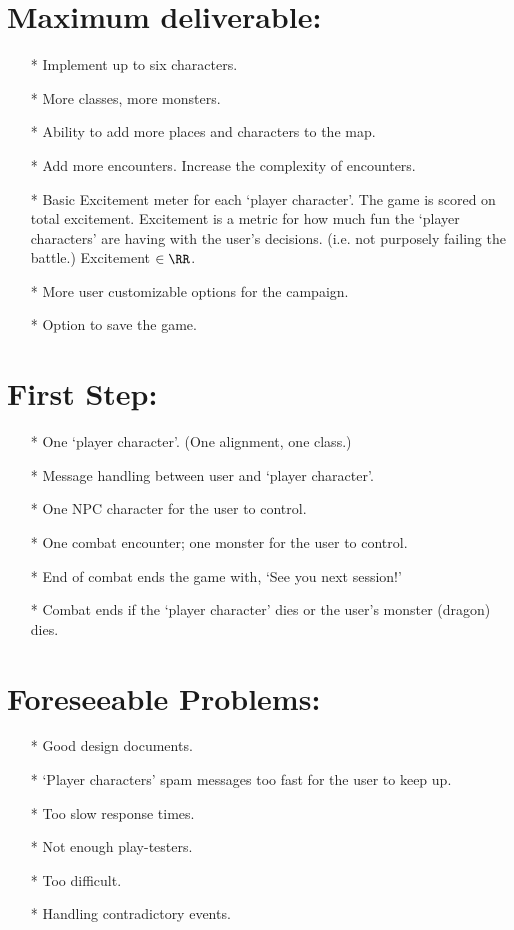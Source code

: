 \documentclass{article}
\theoremstyle{definition}
\begin{document}
\section*{Maximum deliverable:}
\begin{enumerate}
\item [*] Implement up to six characters.
\item [*] More classes, more monsters.
\item [*] Ability to add more places and characters to the map.
\item [*] Add more encounters. Increase the complexity of encounters.
\item [*] Basic Excitement meter for each `player character'. The game is scored
		  on total excitement. Excitement is
		  a metric for how much fun the `player characters' are having with the
		  user's decisions. (i.e. not purposely failing the battle.) Excitement $\in \RR$.
\item [*] More user customizable options for the campaign.
\item [*] Option to save the game.
\end{enumerate}
\section*{First Step:}
\begin{enumerate}
\item [*] One `player character'. (One alignment, one class.)
\item [*] Message handling between user and `player character'.
\item [*] One NPC character for the user to control.
\item [*] One combat encounter; one monster for the user to control.
\item [*] End of combat ends the game with, `See you next session!'
\item [*] Combat ends if the `player character' dies or the user's
		  monster (dragon) dies. 
\end{enumerate}
\section*{Foreseeable Problems:}
\begin{enumerate}
\item [*] Good design documents.
\item [*] `Player characters' spam messages too fast for the user to keep up.
\item [*] Too slow response times.
\item [*] Not enough play-testers.
\item [*] Too difficult.
\item [*] Handling contradictory events.
\end{enumerate}
\end{document}
